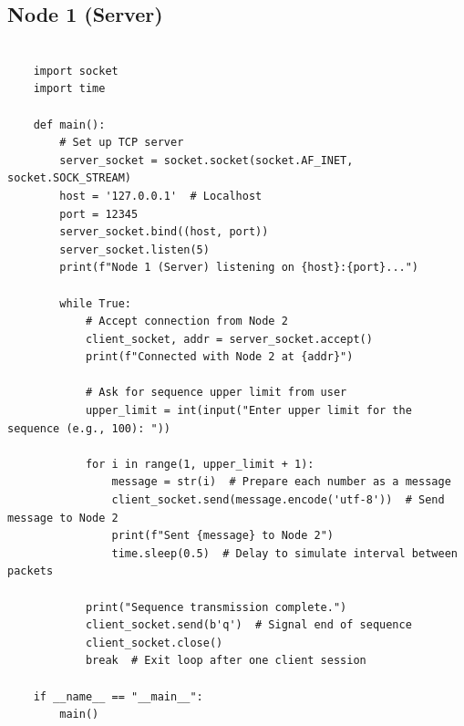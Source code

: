 \documentclass{article}
\begin{document}
\subsection{Node 1 (Server)}
\begin{lstlisting}[style=python]

    import socket
    import time
    
    def main():
        # Set up TCP server
        server_socket = socket.socket(socket.AF_INET, socket.SOCK_STREAM)
        host = '127.0.0.1'  # Localhost
        port = 12345
        server_socket.bind((host, port))
        server_socket.listen(5)
        print(f"Node 1 (Server) listening on {host}:{port}...")
    
        while True:
            # Accept connection from Node 2
            client_socket, addr = server_socket.accept()
            print(f"Connected with Node 2 at {addr}")
    
            # Ask for sequence upper limit from user
            upper_limit = int(input("Enter upper limit for the sequence (e.g., 100): "))
    
            for i in range(1, upper_limit + 1):
                message = str(i)  # Prepare each number as a message
                client_socket.send(message.encode('utf-8'))  # Send message to Node 2
                print(f"Sent {message} to Node 2")
                time.sleep(0.5)  # Delay to simulate interval between packets
    
            print("Sequence transmission complete.")
            client_socket.send(b'q')  # Signal end of sequence
            client_socket.close()
            break  # Exit loop after one client session
    
    if __name__ == "__main__":
        main()
    

\end{lstlisting}
\end{document}
